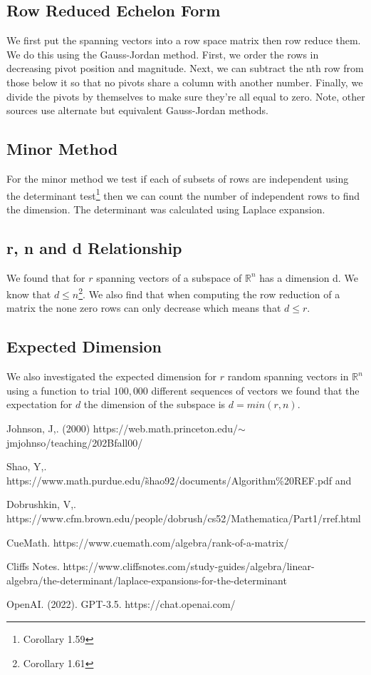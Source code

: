 \documentclass{article}
\begin{document}
\subsection*{Row Reduced Echelon Form}
We first put the spanning vectors into a row space matrix then row reduce them. We do this using the Gauss-Jordan method\cite{Dobrushkin}. First, we order the rows in decreasing pivot position and magnitude. Next, we can subtract the nth row from those below it so that no pivots share a column with another number. Finally, we divide the pivots by themselves to make sure they're all equal to zero. Note, other sources\cite{CueMath} use alternate but equivalent Gauss-Jordan methods.

\subsection*{Minor Method}
For the minor method we test if each of subsets of rows are independent using the determinant test\footnote{Corollary 1.59} then we can count the number of independent rows to find the dimension\cite{CueMath}. The determinant was calculated using Laplace expansion\cite{CliffsNotes}\cite{OpenAI}. 

\subsection*{r, n and d Relationship}
We found that for $r$ spanning vectors of a subspace of $\mathbb{R}^n$ has a dimension d. We know that $d \leq n$\footnote{Corollary 1.61}. We also find that when computing the row reduction of a matrix the none zero rows can only decrease which means that $d\leq r$.

\subsection*{Expected Dimension}
We also investigated the expected dimension for $r$ random spanning vectors in $\mathbb{R}^n$ using a function to trial $100,000$ different sequences of vectors we found that the expectation for $d$ the dimension of the subspace is $d = min(r,n)$. 

\break

\begin{thebibliography}{11}

Johnson, J,. (2000)
https://web.math.princeton.edu/$\sim$jmjohnso/teaching/202Bfall00/

Shao, Y,. 
https://www.math.purdue.edu/\~shao92/documents/Algorithm\%20REF.pdf and 

Dobrushkin, V,. https://www.cfm.brown.edu/people/dobrush/cs52/Mathematica/Part1/rref.html

CueMath. https://www.cuemath.com/algebra/rank-of-a-matrix/

Cliffs Notes. https://www.cliffsnotes.com/study-guides/algebra/linear-algebra/the-determinant/laplace-expansions-for-the-determinant

OpenAI. (2022). GPT-3.5. https://chat.openai.com/

\end{thebibliography}
\end{document}

